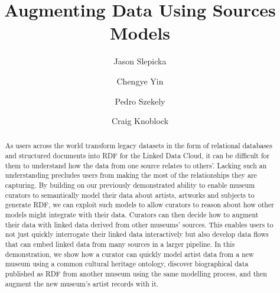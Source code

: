 \documentclass[runningheads,a4paper]{llncs}
\begin{document}
\mainmatter  %

\title{Augmenting Data Using Sources Models}


%
\author{Jason Slepicka%
\and Chengye Yin\and Pedro Szekely\and Craig Knoblock}
%


\maketitle


\begin{abstract}
As users across the world transform legacy datasets in the form of relational databases and structured documents into RDF for the Linked Data Cloud, it can be difficult for them to understand how the data from one source relates to others'.
Lacking such an understanding precludes users from making the most of the relationships they are capturing. 
By building on our previously demonstrated ability to enable museum curators to semantically model their data about artists, artworks and subjects to generate RDF, we can exploit such models to allow curators to reason about how other models might integrate with their data.  
Curators can then decide how to augment their data with linked data derived from other museums' sources.
This enables users to not just quickly interrogate their linked data interactively but also develop data flows that can embed linked data from many sources in a larger pipeline. In this demonstration, we show how a curator can quickly model artist data from a new museum using a common cultural heritage ontology, discover biographical data published as RDF from another museum using the same modelling process, and then augment the new museum's artist records with it.  
\end{abstract}
\end{document}

